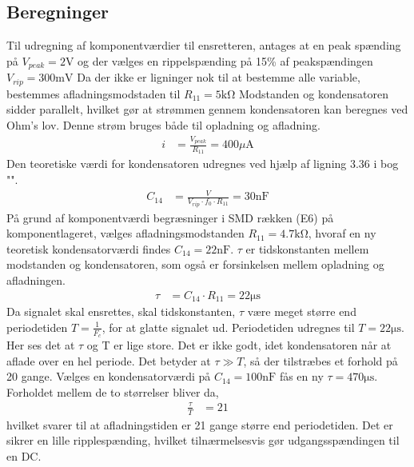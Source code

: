 \subsection{Beregninger}
Til udregning af komponentværdier til ensretteren, antages at en peak spænding på $V_{peak} = 2\si{\volt}$ og der vælges en rippelspænding på 15\% af peakspændingen $V_{rip} = 300 \si{\milli\volt}$
Da der ikke er ligninger nok til at bestemme alle variable, bestemmes afladningsmodstaden til $R_{11} = 5 \si{\kilo\ohm}$
Modstanden og kondensatoren sidder parallelt, hvilket gør at strømmen gennem kondensatoren kan beregnes ved Ohm's lov. Denne strøm bruges både til opladning og afladning.
\begin{align}
	i & = \frac{V_{peak}}{R_{11}} = 400 \si{\mu\ampere}
\end{align}
Den teoretiske værdi for kondensatoren udregnes ved hjælp af ligning 3.36 i bog "\cite[side. 160]{Sedra19uu}".
\begin{align}
	C_{14} & = \frac{V}{V_{rip} \cdot f_0 \cdot R_{11}} = 30\si{\nano\farad}
\end{align}
På grund af komponentværdi begræsninger i SMD rækken (E6) på komponentlageret, vælges afladningsmodstanden $R_{11} = 4.7 \si{\kilo\ohm}$, hvoraf en ny teoretisk kondensatorværdi findes $C_{14} = 22 \si{\nano\farad}$.
$\tau$ er tidskonstanten mellem modstanden og kondensatoren, som også er forsinkelsen mellem opladning og afladningen. 
\begin{align}
	\tau & = C_{14} \cdot R_{11} = 22\si{\micro\second}
\end{align}
Da signalet skal ensrettes, skal tidskonstanten, $\tau$ være meget større end periodetiden $T = \frac{1}{F_c}$, for at glatte signalet ud. Periodetiden udregnes til $T = 22 \si{\micro\second}$. Her ses det at $\tau$ og T er lige store. Det er ikke godt, idet kondensatoren når at aflade over en hel periode. Det betyder at $\tau \gg T$, så der tilstræbes et forhold på 20 gange.
Vælges en kondensatorværdi på $C_{14} = 100 \si{\nano\farad}$ fås en ny $\tau = 470\si{\micro\second}$. Forholdet mellem de to størrelser bliver da, 
\begin{align}
	\frac{\tau}{T} & = 21
\end{align}
hvilket svarer til at afladningstiden er 21 gange større end periodetiden. Det er sikrer en lille ripplespænding, hvilket tilnærmelsesvis gør udgangsspændingen til en DC.